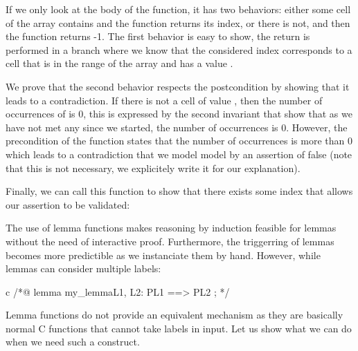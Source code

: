 


If we only look at the body of the function, it has two behaviors: either some
cell of the array contains  and the function returns its index, or
there is not, and then the function returns -1. The first behavior is easy to
show, the return is performed in a branch where we know that the considered
index corresponds to a cell that is in the range of the array and has a value
.



We prove that the second behavior respects the postcondition by showing that it
leads to a contradiction. If there is not a cell of value , then
the number of occurrences of  is 0, this is expressed by the
second invariant that show that as we have not met any  since we
started, the number of occurrences is 0. However, the precondition of the
function states that the number of occurrences is more than $0$ which leads to
a contradiction that we model model by an assertion of false (note that this is
not necessary, we explicitely write it for our explanation).



Finally, we can call this function to show that there exists some index that
allows our assertion to be validated:






The use of lemma functions makes reasoning by induction feasible for lemmas
without the need of interactive proof. Furthermore, the triggerring of lemmas
becomes more predictible as we instanciate them by hand. However, while lemmas
can consider multiple labels:



\begin{CodeBlock}{c}
/*@
  lemma my_lemma{L1, L2}:  P{L1} ==> P{L2} ;
*/
\end{CodeBlock}



Lemma functions do not provide an equivalent mechanism as they are basically
normal C functions that cannot take labels in input. Let us show what we can
do when we need such a construct.






